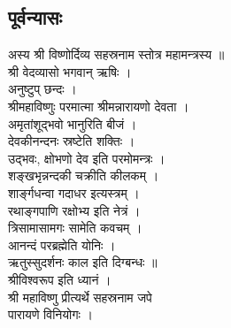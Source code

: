 \subsection{पूर्वन्यासः}
अस्य श्री विष्णोर्दिव्य सहस्रनाम स्तोत्र महामन्त्रस्य ॥\\
श्री वेदव्यासो भगवान् ऋषिः ।\\
अनुष्टुप् छन्दः ।\\
श्रीमहाविष्णुः परमात्मा श्रीमन्नारायणो देवता ।\\
अमृतांशूद्भवो भानुरिति बीजं ।\\
देवकीनन्दनः स्रष्टेति शक्तिः ।\\
उद्भवः, क्षोभणो देव इति परमोमन्त्रः ।\\
शङ्खभृन्नन्दकी चक्रीति कीलकम् ।\\
शार्ङ्गधन्वा गदाधर इत्यस्त्रम् ।\\
रथाङ्गपाणि रक्षोभ्य इति नेत्रं ।\\
त्रिसामासामगः सामेति कवचम् ।\\
आनन्दं परब्रह्मेति योनिः ।\\
ऋतुस्सुदर्शनः काल इति दिग्बन्धः ॥\\
श्रीविश्वरूप इति ध्यानं ।\\
श्री महाविष्णु प्रीत्यर्थे सहस्रनाम जपे \\
         पारायणे विनियोगः ।\\
